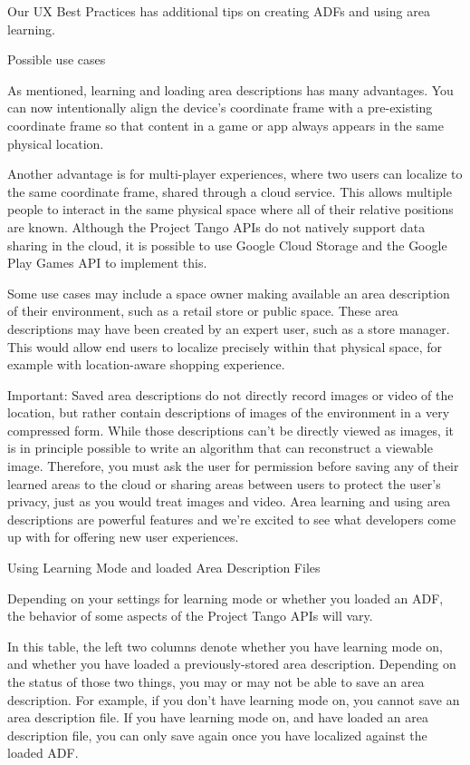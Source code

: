Our UX Best Practices has additional tips on creating ADFs and using area learning.

Possible use cases

As mentioned, learning and loading area descriptions has many advantages. You can now intentionally align the device's coordinate frame with a pre-existing coordinate frame so that content in a game or app always appears in the same physical location.

Another advantage is for multi-player experiences, where two users can localize to the same coordinate frame, shared through a cloud service. This allows multiple people to interact in the same physical space where all of their relative positions are known. Although the Project Tango APIs do not natively support data sharing in the cloud, it is possible to use Google Cloud Storage and the Google Play Games API to implement this.

Some use cases may include a space owner making available an area description of their environment, such as a retail store or public space. These area descriptions may have been created by an expert user, such as a store manager. This would allow end users to localize precisely within that physical space, for example with location-aware shopping experience.

Important: Saved area descriptions do not directly record images or video of the location, but rather contain descriptions of images of the environment in a very compressed form. While those descriptions can’t be directly viewed as images, it is in principle possible to write an algorithm that can reconstruct a viewable image. Therefore, you must ask the user for permission before saving any of their learned areas to the cloud or sharing areas between users to protect the user's privacy, just as you would treat images and video.
Area learning and using area descriptions are powerful features and we’re excited to see what developers come up with for offering new user experiences.

Using Learning Mode and loaded Area Description Files

Depending on your settings for learning mode or whether you loaded an ADF, the behavior of some aspects of the Project Tango APIs will vary.

In this table, the left two columns denote whether you have learning mode on, and whether you have loaded a previously-stored area description. Depending on the status of those two things, you may or may not be able to save an area description. For example, if you don't have learning mode on, you cannot save an area description file. If you have learning mode on, and have loaded an area description file, you can only save again once you have localized against the loaded ADF.

